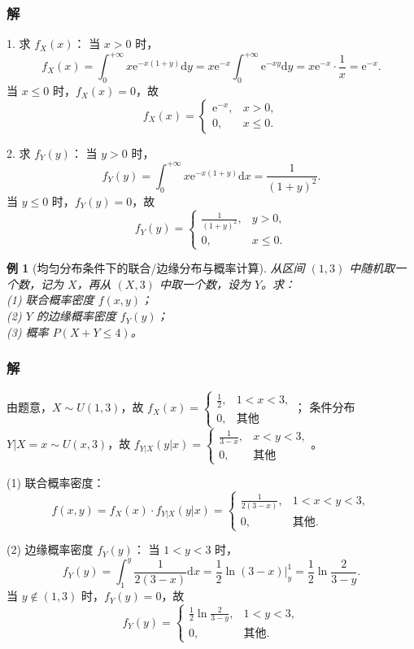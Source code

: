 \documentclass{book}
\newtheorem{example}{例}[subsection]
\begin{document}
\subsubsection{解}
1. 求 $f_X(x)$：
当 $x > 0$ 时，
\[
f_X(x) = \int_{0}^{+\infty} x \mathrm{e}^{-x(1+y)} \mathrm{d}y = x\mathrm{e}^{-x} \int_{0}^{+\infty} \mathrm{e}^{-xy} \mathrm{d}y = x\mathrm{e}^{-x} \cdot \frac{1}{x} = \mathrm{e}^{-x}.
\]
当 $x \le 0$ 时，$f_X(x) = 0$，故
\[
f_X(x) = \begin{cases} \mathrm{e}^{-x}, & x>0, \\ 0, & x\le0. \end{cases}
\]

2. 求 $f_Y(y)$：
当 $y > 0$ 时，
\[
f_Y(y) = \int_{0}^{+\infty} x \mathrm{e}^{-x(1+y)} \mathrm{d}x = \frac{1}{(1+y)^2}.
\]
当 $y \le 0$ 时，$f_Y(y) = 0$，故
\[
f_Y(y) = \begin{cases} \displaystyle \frac{1}{(1+y)^2}, & y>0, \\ 0, & x\le0. \end{cases}
\]

\begin{example}[均匀分布条件下的联合/边缘分布与概率计算]
从区间 $(1,3)$ 中随机取一个数，记为 $X$，再从 $(X,3)$ 中取一个数，设为 $Y$。求：\\
(1) 联合概率密度 $f(x,y)$；\\
(2) $Y$ 的边缘概率密度 $f_Y(y)$；\\
(3) 概率 $P(X + Y \leq 4)$。
\end{example}

\subsubsection{解}
由题意，$X \sim U(1,3)$，故 $f_X(x) = \begin{cases} \frac{1}{2}, & 1<x<3, \\ 0, & \text{其他} \end{cases}$；
条件分布 $Y|X=x \sim U(x,3)$，故 $f_{Y|X}(y|x) = \begin{cases} \frac{1}{3-x}, & x<y<3, \\ 0, & \text{其他} \end{cases}$。

(1) 联合概率密度：
\[
f(x,y) = f_X(x) \cdot f_{Y|X}(y|x) = \begin{cases} \frac{1}{2(3-x)}, & 1<x<y<3, \\ 0, & \text{其他}. \end{cases}
\]

(2) 边缘概率密度 $f_Y(y)$：
当 $1<y<3$ 时，
\[
f_Y(y) = \int_{1}^{y} \frac{1}{2(3-x)} \mathrm{d}x = \frac{1}{2} \left. \ln(3-x) \right|_{y}^{1} = \frac{1}{2} \ln \frac{2}{3-y}.
\]
当 $y \notin (1,3)$ 时，$f_Y(y) = 0$，故
\[
f_Y(y) = \begin{cases} \frac{1}{2} \ln \frac{2}{3-y}, & 1<y<3, \\ 0, & \text{其他}. \end{cases}
\]
\end{document}

